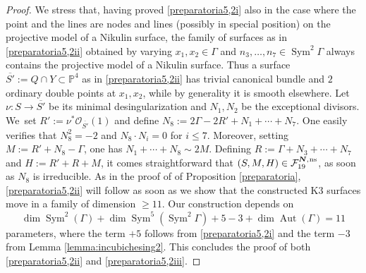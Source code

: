 \documentclass[JEP,XML,SOM,Unicode,NoEqCountersInSection,published]{cedram}
\newcommand{\ns}{{\mkern1mu\mathrm{ns}}}
\newcommand{\bN}{\boldsymbol{N}}
\theoremstyle{plain}
\theoremstyle{definition}
\DeclareMathOperator{\Aut}{Aut}
\DeclareMathOperator{\Sym}{Sym}
\newcommand\PP{{\mathbb P}}
\newcommand\F{{\mathcal F}}
\begin{document}
\begin{proof}
We stress that, having proved \eqref{preparatoria5,2i} also in the case where the point and the lines are nodes and lines (possibly in special position) on the projective model of a Nikulin surface, the family of surfaces as in \eqref{preparatoria5,2ii} obtained by varying $x_1,x_2 \in \Gamma$ and $n_3,\ldots,n_7\in \Sym^2\Gamma$ always contains the projective model of a Nikulin surface.
Thus a surface $\overline{S'}:= Q\cap Y\subset \PP^4$ as in \eqref{preparatoria5,2ii} has trivial canonical bundle and $2$ ordinary double points at $x_1,x_2$, while by generality it is smooth elsewhere. Let $\nu:S\to \overline{S'}$ be its minimal desingularization and $N_1,N_2$ be the exceptional divisors. We~set $R':=\nu^*\mathcal O_{\overline{S'}}(1)$ and define $N_8:=2\Gamma-2R'+N_1+\cdots+N_7$. One easily verifies that $N_8^2=-2$ and
$N_8 \cdot N_i=0$ for $i\leq 7$. Moreover, setting $M:=R'+N_8-\Gamma$, one has
$N_1+\cdots+N_8 \sim 2M$. Defining $R:=\Gamma+N_3+\cdots+N_7$ and $H:=R'+R+M$, it comes straightforward that $(S,M,H)\in \F_{19}^{\bN,\ns}$, as soon as $N_8$ is irreducible. As in the proof of of Proposition \ref{preparatoria}, \eqref{preparatoria5,2ii} will
follow as soon as we show that the constructed K3 surfaces move in a family of dimension $\geq 11$. Our construction depends on
\[
\dim\Sym^2(\Gamma)+\dim \Sym^5(\Sym^2\Gamma)+5-3+\dim \Aut(\Gamma)=11
\]
parameters, where the term $+5$ follows from \eqref{preparatoria5,2i} and the term $-3$ from Lemma \ref{lemma:incubichesing2}. This concludes the proof of both \eqref{preparatoria5,2ii} and \eqref{preparatoria5,2iii}.
\end{proof}
\end{document}
